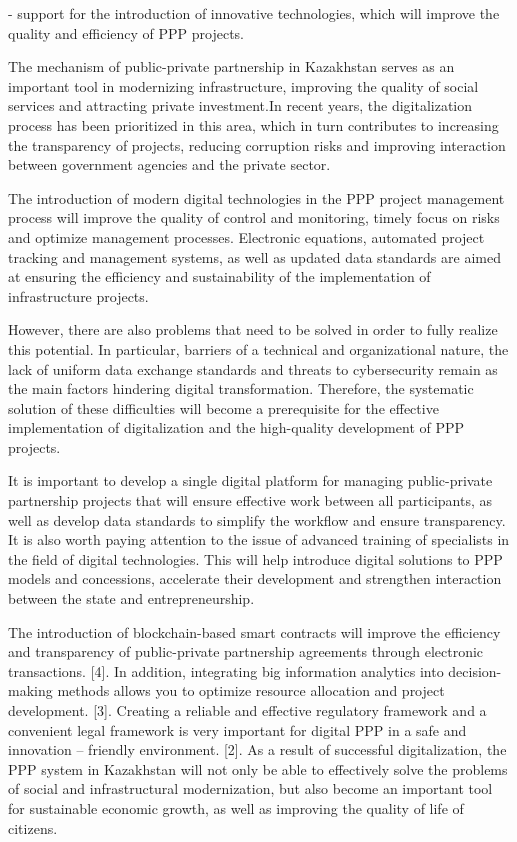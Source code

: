 - support for the introduction of innovative technologies, which will
improve the quality and efficiency of PPP projects.

The mechanism of public-private partnership in Kazakhstan serves as an
important tool in modernizing infrastructure, improving the quality of
social services and attracting private investment.In recent years, the
digitalization process has been prioritized in this area, which in turn
contributes to increasing the transparency of projects, reducing
corruption risks and improving interaction between government agencies
and the private sector.

The introduction of modern digital technologies in the PPP project
management process will improve the quality of control and monitoring,
timely focus on risks and optimize management processes. Electronic
equations, automated project tracking and management systems, as well as
updated data standards are aimed at ensuring the efficiency and
sustainability of the implementation of infrastructure projects.

However, there are also problems that need to be solved in order to
fully realize this potential. In particular, barriers of a technical and
organizational nature, the lack of uniform data exchange standards and
threats to cybersecurity remain as the main factors hindering digital
transformation. Therefore, the systematic solution of these difficulties
will become a prerequisite for the effective implementation of
digitalization and the high-quality development of PPP projects.

It is important to develop a single digital platform for managing
public-private partnership projects that will ensure effective work
between all participants, as well as develop data standards to simplify
the workflow and ensure transparency. It is also worth paying attention
to the issue of advanced training of specialists in the field of digital
technologies. This will help introduce digital solutions to PPP models
and concessions, accelerate their development and strengthen interaction
between the state and entrepreneurship.

The introduction of blockchain-based smart contracts will improve the
efficiency and transparency of public-private partnership agreements
through electronic transactions. {[}4{]}. In addition, integrating big
information analytics into decision-making methods allows you to
optimize resource allocation and project development. {[}3{]}. Creating
a reliable and effective regulatory framework and a convenient legal
framework is very important for digital PPP in a safe and innovation --
friendly environment. {[}2{]}. As a result of successful digitalization,
the PPP system in Kazakhstan will not only be able to effectively solve
the problems of social and infrastructural modernization, but also
become an important tool for sustainable economic growth, as well as
improving the quality of life of citizens.

